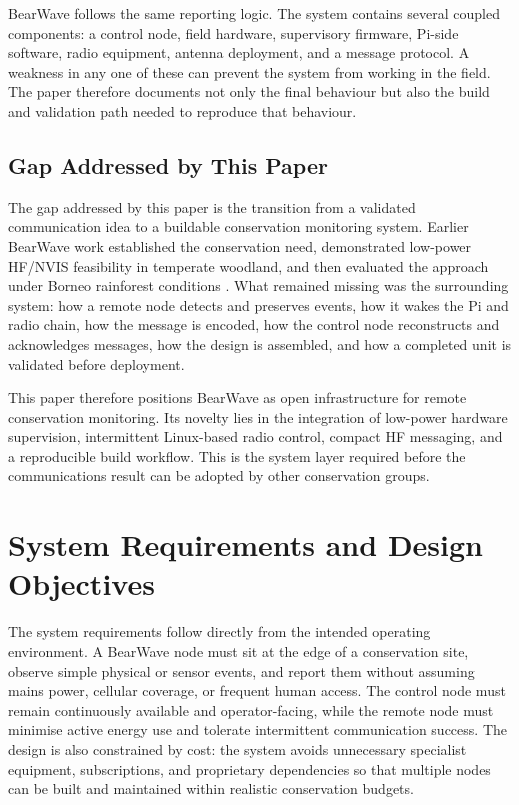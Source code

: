 \documentclass[acmsmall,screen]{acmart}
\begin{document}
BearWave follows the same reporting logic. The system contains several coupled components: a control node, field hardware, supervisory firmware, Pi-side software, radio equipment, antenna deployment, and a message protocol. A weakness in any one of these can prevent the system from working in the field. The paper therefore documents not only the final behaviour but also the build and validation path needed to reproduce that behaviour.

\subsection{Gap Addressed by This Paper}
The gap addressed by this paper is the transition from a validated communication idea to a buildable conservation monitoring system. Earlier BearWave work established the conservation need, demonstrated low-power HF/NVIS feasibility in temperate woodland, and then evaluated the approach under Borneo rainforest conditions \cite{ButterworthMarkAndrew2025ERCi,Butterworth2026BorneoFieldTrial}. What remained missing was the surrounding system: how a remote node detects and preserves events, how it wakes the Pi and radio chain, how the message is encoded, how the control node reconstructs and acknowledges messages, how the design is assembled, and how a completed unit is validated before deployment.

This paper therefore positions BearWave as open infrastructure for remote conservation monitoring. Its novelty lies in the integration of low-power hardware supervision, intermittent Linux-based radio control, compact HF messaging, and a reproducible build workflow. This is the system layer required before the communications result can be adopted by other conservation groups.

\section{System Requirements and Design Objectives}
The system requirements follow directly from the intended operating environment. A BearWave node must sit at the edge of a conservation site, observe simple physical or sensor events, and report them without assuming mains power, cellular coverage, or frequent human access. The control node must remain continuously available and operator-facing, while the remote node must minimise active energy use and tolerate intermittent communication success. The design is also constrained by cost: the system avoids unnecessary specialist equipment, subscriptions, and proprietary dependencies so that multiple nodes can be built and maintained within realistic conservation budgets.
\end{document}
